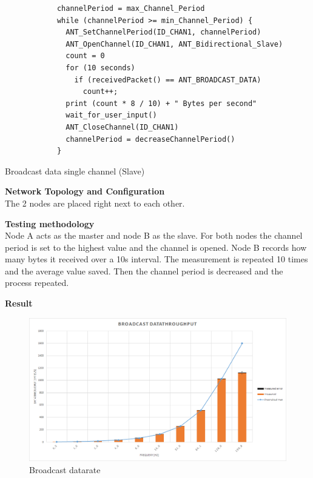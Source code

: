 \begin{description}
		\begin{code}[h]
			\begin{verbatim}
			channelPeriod = max_Channel_Period
			while (channelPeriod >= min_Channel_Period) {
			  ANT_SetChannelPeriod(ID_CHAN1, channelPeriod)
			  ANT_OpenChannel(ID_CHAN1, ANT_Bidirectional_Slave)
			  count = 0
			  for (10 seconds) 
			    if (receivedPacket() == ANT_BROADCAST_DATA)
			      count++;			  
			  print (count * 8 / 10) + " Bytes per second"
			  wait_for_user_input()
			  ANT_CloseChannel(ID_CHAN1)
			  channelPeriod = decreaseChannelPeriod()
			}
			\end{verbatim}
			\caption{Broadcast data single channel (Slave)}\label{lst:sExp1}
		\end{code}	
	\item{\textbf{Network Topology and Configuration}} \hfill \\ The 2 nodes are placed right next to each other.
	 \item{\textbf{Testing methodology}} \hfill \\Node A acts as the master and node B as the slave. For both nodes the channel period is set to the highest value and the channel is opened. Node B records how many bytes it received over a 10s interval. The measurement is repeated 10 times and the average value saved. Then the channel period is decreased and the process repeated.
	\item{\textbf{Result}} \hfill \\  
	\begin{figure}[h]
	\centering
	\includegraphics[scale=0.5]{./pics/exp1_norm.png}
	\caption{Broadcast datarate}\label{fig:exp1norm}
	\end{figure}
	

\end{description}
